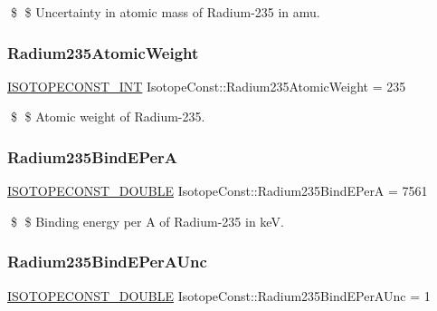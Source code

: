 \$ \$ Uncertainty in atomic mass of Radium-\/235 in amu. \mbox{\label{group___isotope_const-_radium-_ra235_ga5a1fb096c6a8e8e0d84bb8f12e847a39}} 
\subsubsection{\texorpdfstring{Radium235\+Atomic\+Weight}{Radium235AtomicWeight}}
{\footnotesize\ttfamily \mbox{\hyperlink{group___isotope_const-_macros_ga5f18360b3e99483a35c32d789e62621c}{I\+S\+O\+T\+O\+P\+E\+C\+O\+N\+S\+T\+\_\+\+I\+NT}} Isotope\+Const\+::\+Radium235\+Atomic\+Weight = 235}

\$ \$ Atomic weight of Radium-\/235. \mbox{\label{group___isotope_const-_radium-_ra235_gaad1e99345fdbcb7a228454149e6a40db}} 
\subsubsection{\texorpdfstring{Radium235\+Bind\+E\+PerA}{Radium235BindEPerA}}
{\footnotesize\ttfamily \mbox{\hyperlink{group___isotope_const-_macros_ga8f45a7272ce02c0b4c65c44636ed719a}{I\+S\+O\+T\+O\+P\+E\+C\+O\+N\+S\+T\+\_\+\+D\+O\+U\+B\+LE}} Isotope\+Const\+::\+Radium235\+Bind\+E\+PerA = 7561}

\$ \$ Binding energy per A of Radium-\/235 in keV. \mbox{\label{group___isotope_const-_radium-_ra235_ga3d1027aaada8ca080908a60b4bd456d5}} 
\subsubsection{\texorpdfstring{Radium235\+Bind\+E\+Per\+A\+Unc}{Radium235BindEPerAUnc}}
{\footnotesize\ttfamily \mbox{\hyperlink{group___isotope_const-_macros_ga8f45a7272ce02c0b4c65c44636ed719a}{I\+S\+O\+T\+O\+P\+E\+C\+O\+N\+S\+T\+\_\+\+D\+O\+U\+B\+LE}} Isotope\+Const\+::\+Radium235\+Bind\+E\+Per\+A\+Unc = 1}

